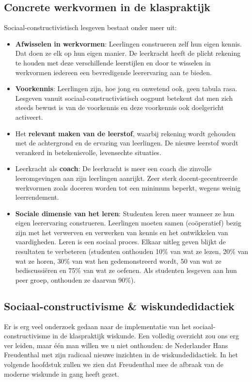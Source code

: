 \documentclass[a4paper,11pt]{article}
\begin{document}
\subsection{Concrete werkvormen in de klaspraktijk}
Sociaal-constructivistisch lesgeven bestaat onder meer uit:
\begin{itemize}
\item \textbf{Afwisselen in werkvormen}: Leerlingen construeren zelf hun eigen kennis. Dat doen
ze elk op hun eigen manier. De leerkracht heeft de plicht rekening te houden met deze
verschillende leerstijlen en door te wisselen in werkvormen iedereen een bevredigende
leerervaring aan te bieden.
\item \textbf{Voorkennis}: Leerlingen zijn, hoe jong en onwetend ook, geen tabula rasa. Lesgeven
vanuit sociaal-constructivistisch oogpunt betekent dat men zich steeds bewust is van de
voorkennis en deze voorkennis ook doelgericht activeert. \item Het \textbf{relevant maken van de leerstof}, waarbij rekening wordt gehouden met de
achtergrond en de ervaring van leerlingen. De nieuwe leerstof wordt verankerd in betekenisvolle,
levensechte situaties.
\item Leerkracht als \textbf{coach}: De leerkracht is meer een coach die zinvolle leeromgevingen
aan zijn leerlingen aanrijkt. Zeer sterk docent-gecentreerde werkvormen zoals doceren
worden tot een minimum beperkt, wegens weinig leerrendement.
\item \textbf{Sociale dimensie van het leren}: Studenten leren meer wanneer ze hun eigen leerervaring
construeren. Leerlingen moeten samen (coöperatief) bezig zijn met het verwerven
en verwerken van kennis en het ontwikkelen van vaardigheden. Leren is een sociaal proces.
Elkaar uitleg geven blijkt de resultaten te verbeteren (studenten onthouden 10\%
van wat ze lezen, 20\% van wat ze horen, 30\% van wat hen gedemonstreerd wordt, 50\!%
van wat ze bediscussiëren en 75\% van wat ze oefenen. Als studenten lesgeven aan hun
peer groep, onthouden ze daarvan 90\%).
\end{itemize}
\subsection{Sociaal-constructivisme \& wiskundedidactiek}
Er is erg veel onderzoek gedaan naar de implementatie van het 
sociaal-constructivisme in de klaspraktijk wiskunde. Een volledig overzicht zou 
ons erg ver leiden, maar één man willen we u niet onthouden: de Nederlander Hans 
Freudenthal met zijn radicaal nieuwe inzichten in de wiskundedidactiek. In het 
volgende hoofdstuk zullen we zien dat Freudenthal mee de afbraak van de moderne 
wiskunde in gang heeft gezet.
\end{document}
